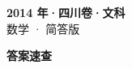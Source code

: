 \documentclass[zihao=-4, a4paper]{ctexart}
\begin{document}
\begin{center}
  {\Large\bfseries 2014 年·四川卷·文科}\\[4pt]
  {\large 数学 · 简答版}
\end{center}
\medskip
{}

\clearpage
{}
\begin{center}{\Large\bfseries 答案速查}\end{center}
\medskip

\end{document}
